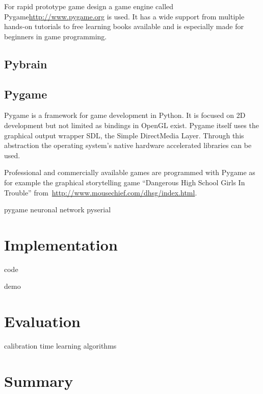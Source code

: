 \documentclass[bibtotocnumbered, headsepline,normalheadings,12pt]{report}
\begin{document}
For rapid prototype game design a game engine called Pygame\url{http://www.pygame.org} is used. It has a wide support from multiple 
hands-on tutorials to free learning books available and is especially made for beginners in game programming.

\section{Pybrain}

\section{Pygame}

Pygame is a framework for game development in Python. It is focused on 2D development but not limited as bindings in OpenGL
exist. Pygame itself uses the graphical output wrapper SDL, the Simple DirectMedia Layer. Through this abstraction the 
operating system's native hardware accelerated libraries can be used.

Professional and commercially available games are programmed with Pygame as for example the graphical storytelling game
``Dangerous High School Girls In Trouble'' from~\url{http://www.mousechief.com/dhsg/index.html}.


pygame
neuronal network
pyserial

\chapter{Implementation}
\label{chap:impl}

code

demo

\chapter{Evaluation}
\label{chap:eva}

calibration time
learning algorithms

\chapter{Summary}
\label{chap:sum}

\nocite{*}


\listoffigures
\lstlistoflistings
\begingroup \let\clearpage\relax
\listoftables \endgroup
\end{document}
